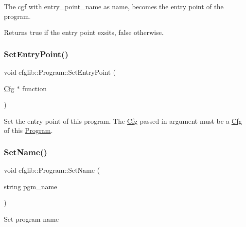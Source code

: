The cgf with entry\+\_\+point\+\_\+name as name, becomes the entry point of the program. \begin{DoxyReturn}{Returns}
true if the entry point exsits, false otherwise. 
\end{DoxyReturn}
\mbox{\label{classcfglib_1_1Program_a9afd774f6cdaed6441b3ecd37887ecd3}} 
\subsubsection{\texorpdfstring{Set\+Entry\+Point()}{SetEntryPoint()}\hspace{0.1cm}{\footnotesize\ttfamily [2/2]}}
{\footnotesize\ttfamily void cfglib\+::\+Program\+::\+Set\+Entry\+Point (\begin{DoxyParamCaption}\item[{\hyperlink{classcfglib_1_1Cfg}{Cfg} $\ast$}]{function }\end{DoxyParamCaption})}

Set the entry point of this program. The \hyperlink{classcfglib_1_1Cfg}{Cfg} passed in argument must be a \hyperlink{classcfglib_1_1Cfg}{Cfg} of this \hyperlink{classcfglib_1_1Program}{Program}. \mbox{\label{classcfglib_1_1Program_acfcd600e324f86042ce08d27ec506cc2}} 
\subsubsection{\texorpdfstring{Set\+Name()}{SetName()}}
{\footnotesize\ttfamily void cfglib\+::\+Program\+::\+Set\+Name (\begin{DoxyParamCaption}\item[{string}]{pgm\+\_\+name }\end{DoxyParamCaption})}

Set program name \mbox{\label{classcfglib_1_1Program_af486d3bd0aac88830c13289e5a416f07}} 
